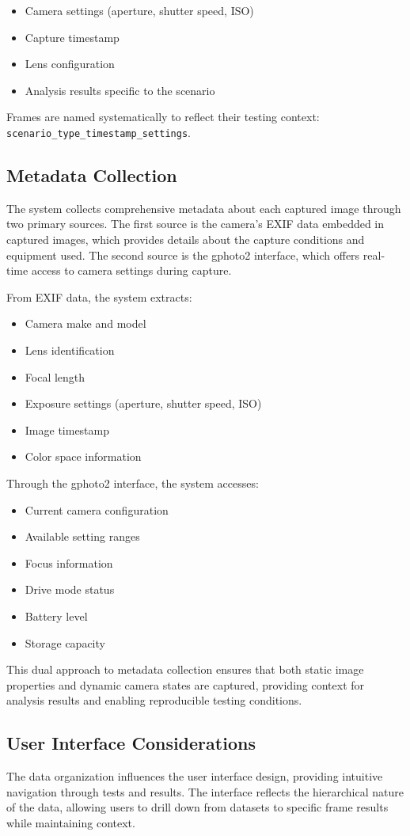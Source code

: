 \begin{itemize}
    \item Camera settings (aperture, shutter speed, ISO)
    \item Capture timestamp
    \item Lens configuration
    \item Analysis results specific to the scenario
\end{itemize}

Frames are named systematically to reflect their testing context: \texttt{scenario\_type\_timestamp\_settings}.

\subsection{Metadata Collection}

The system collects comprehensive metadata about each captured image through two primary sources. The first source is the camera's EXIF data embedded in captured images, which provides details about the capture conditions and equipment used. The second source is the gphoto2 interface, which offers real-time access to camera settings during capture.

From EXIF data, the system extracts:
\begin{itemize}
    \item Camera make and model
    \item Lens identification
    \item Focal length
    \item Exposure settings (aperture, shutter speed, ISO)
    \item Image timestamp
    \item Color space information
\end{itemize}

Through the gphoto2 interface, the system accesses:
\begin{itemize}
    \item Current camera configuration
    \item Available setting ranges
    \item Focus information
    \item Drive mode status
    \item Battery level
    \item Storage capacity
\end{itemize}

This dual approach to metadata collection ensures that both static image properties and dynamic camera states are captured, providing context for analysis results and enabling reproducible testing conditions.


\subsection{User Interface Considerations}
The data organization influences the user interface design, providing intuitive navigation through tests and results. The interface reflects the hierarchical nature of the data, allowing users to drill down from datasets to specific frame results while maintaining context.
